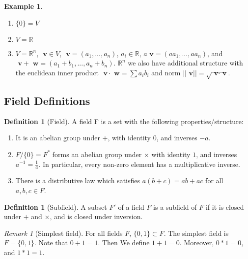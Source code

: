\documentclass[12pt]{article}
\theoremstyle{definition}
\newtheorem{defn}[thm]{Definition}
\newtheorem{eg}[thm]{Example}
\theoremstyle{remark}
\newtheorem{rmk}[thm]{Remark}
\numberwithin{equation}{section}
\newcommand\R{\mathbb R}    %
\newcommand\B[1]{\textbf{ #1}}
\begin{document}
\begin{eg}
        \begin{enumerate}
                \item $\{0\} = V$
                \item $V = \R$
                \item $V = \R^n$, $\B{v} \in V$, $\B{v} =(a_1,...,a_n)$, $a_i \in \R$, $a\B{v} = (aa_1,...,aa_n)$, and $\B{v}+\B{w} = (a_1+b_1,...,a_n+b_n)$. $\R^n$ we also have additional structure with the euclidean inner product $\B{v}\cdot\B{w} = \sum a_ib_i$ and norm $||\B{v}|| = \sqrt{\B{v}\cdot \B{v}}$.
        \end{enumerate}
\end{eg}

\vspace{15pt}

\subsection{Field Definitions}

\begin{defn}[Field]
        A field F is a set with the following properties/structure:\begin{enumerate}
                \item It is an abelian group under $+$, with identity $0$, and inverses $-a$.
                \item $F/\{0\} = F^*$ forms an abelian group under $\times$ with identity $1$, and inverses $a^{-1} = \frac{1}{a}$. In particular, every non-zero element has a multiplicative inverse.
                \item There is a distributive law which satisfies $a(b+c) = ab+ac$ for all $a,b,c \in F$.
        \end{enumerate}
\end{defn}


\vspace{15pt}

\begin{defn}[Subfield]
        A subset $F'$ of a field $F$ is a subfield of $F$ if it is closed under $+$ and $\times$, and is closed under inversion.
\end{defn}

\vspace{15pt}

\begin{rmk}[Simplest field]
        For all fields $F$, $\{0,1\} \subset F$. The simplest field is $F = \{0,1\}$. Note that $0 + 1 = 1$. Then We define $1+1 = 0$. Moreover, $0*1 = 0$, and $1*1 = 1$. 
\end{rmk}
\end{document}
